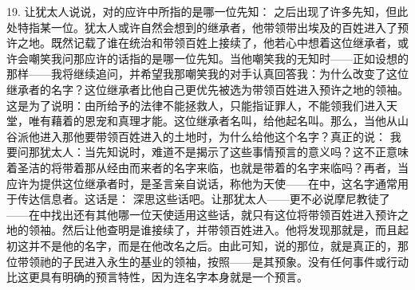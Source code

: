 19. 让犹太人说说，对的应许中所指的是哪一位先知： 之后出现了许多先知，但此处特指某一位。犹太人或许自然会想到的继承者，他带领带出埃及的百姓进入了预许之地。既然记载了谁在统治和带领百姓上接续了，他若心中想着这位继承者，或许会嘲笑我问那应许的话指的是哪一位先知。当他嘲笑我的无知时——正如设想的那样——我将继续追问，并希望我那嘲笑我的对手认真回答我：为什么改变了这位继承者的名字？这位继承者比他自己更优先被选为带领百姓进入预许之地的领袖。这是为了说明：由所给予的法律不能拯救人，只能指证罪人，不能领我们进入天堂，唯有藉着的恩宠和真理才能。这位继承者名叫，给他起名叫。那么，当他从山谷派他进入那他要带领百姓进入的土地时，为什么给他这个名字？真正的说： 我要问那犹太人：当先知说时，难道不是揭示了这些事情预言的意义吗？这不正意味着圣洁的将带着那从经由而来者的名字来临，也就是带着的名字来临吗？再者，当应许为提供这位继承者时，是圣言亲自说话，称他为天使——在中，这名字通常用于传达信息者。这话是： 深思这些话吧。让那犹太人——更不必说摩尼教徒了——在中找出还有其他哪一位天使适用这些话，就只有这位将带领百姓进入预许之地的领袖。然后让他查明是谁接续了，并带领百姓进入。他将发现那就是，而且起初这并不是他的名字，而是在他改名之后。由此可知，说的那位，就是真正的，那位带领祂的子民进入永生的基业的领袖，按照——是其预象。没有任何事件或行动比这更具有明确的预言特性，因为连名字本身就是一个预言。\par

